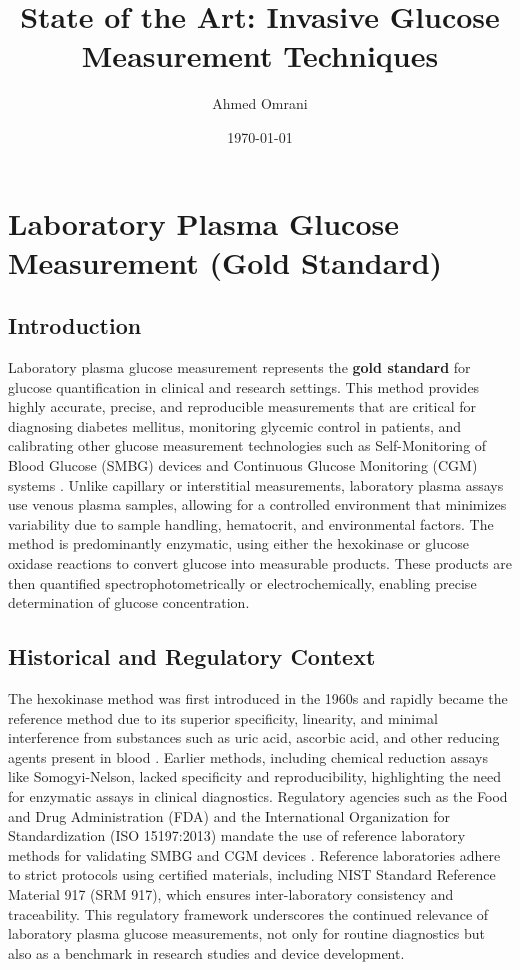 \documentclass[12pt,a4paper]{article}
\title{State of the Art: Invasive Glucose Measurement Techniques}
\author{Ahmed Omrani}
\date{\today}
\begin{document}
\maketitle
\tableofcontents
\newpage

\section{Laboratory Plasma Glucose Measurement (Gold Standard)}

\subsection{Introduction}
Laboratory plasma glucose measurement represents the \textbf{gold standard} for glucose quantification in clinical and research settings. This method provides highly accurate, precise, and reproducible measurements that are critical for diagnosing diabetes mellitus, monitoring glycemic control in patients, and calibrating other glucose measurement technologies such as Self-Monitoring of Blood Glucose (SMBG) devices and Continuous Glucose Monitoring (CGM) systems \cite{Sacks2011}. Unlike capillary or interstitial measurements, laboratory plasma assays use venous plasma samples, allowing for a controlled environment that minimizes variability due to sample handling, hematocrit, and environmental factors. The method is predominantly enzymatic, using either the hexokinase or glucose oxidase reactions to convert glucose into measurable products. These products are then quantified spectrophotometrically or electrochemically, enabling precise determination of glucose concentration.

\subsection{Historical and Regulatory Context}
The hexokinase method was first introduced in the 1960s and rapidly became the reference method due to its superior specificity, linearity, and minimal interference from substances such as uric acid, ascorbic acid, and other reducing agents present in blood \cite{Hagvik2007}. Earlier methods, including chemical reduction assays like Somogyi-Nelson, lacked specificity and reproducibility, highlighting the need for enzymatic assays in clinical diagnostics. Regulatory agencies such as the Food and Drug Administration (FDA) and the International Organization for Standardization (ISO 15197:2013) mandate the use of reference laboratory methods for validating SMBG and CGM devices \cite{CataChem2020}. Reference laboratories adhere to strict protocols using certified materials, including NIST Standard Reference Material 917 (SRM 917), which ensures inter-laboratory consistency and traceability. This regulatory framework underscores the continued relevance of laboratory plasma glucose measurements, not only for routine diagnostics but also as a benchmark in research studies and device development.
\end{document}
